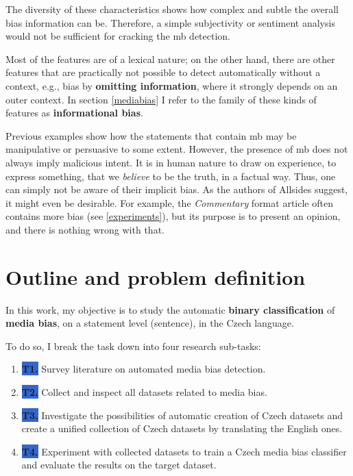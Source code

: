 The diversity of these characteristics shows how complex and subtle the overall bias information can be. Therefore, a simple subjectivity or sentiment analysis would not be sufficient for cracking the \gls{mb} detection. 

Most of the features are of a lexical nature; on the other hand, there are other features that are practically not possible to detect automatically without a context, e.g., bias by \textbf{omitting information}, where it strongly depends on an outer context. In section \ref{mediabias} I refer to the family of these kinds of features as \textbf{informational bias}.


Previous examples show how the statements that contain \gls{mb} may be manipulative or persuasive to some extent. However, the presence of \gls{mb} does not always imply malicious intent. It is in human nature to draw on experience, to express something, that we \textit{believe} to be the truth, in a factual way. Thus, one can simply not be aware of their implicit bias. As the authors of Allsides suggest, it might even be desirable. For example, the \textit{Commentary} format article often contains more bias (see \ref{experiments}), but its purpose is to present an opinion, and there is nothing wrong with that.



\section{Outline and problem definition}\label{problem_definition}
In this work, my objective is to study the automatic \textbf{binary classification} of \textbf{media bias}, on a statement level (sentence), in the Czech language.

 To do so, I break the task down into four research sub-tasks:
 \begin{enumerate}
     \item[] \colorbox{highlight}{\textbf{T1.}\label{T1}} Survey literature on automated media bias detection.
     \item[] \colorbox{highlight}{\textbf{T2.}\label{T2}} Collect and inspect all datasets related to media bias.
     \item[] \colorbox{highlight}{\textbf{T3.}\label{T3}} Investigate the possibilities of automatic creation of Czech datasets and create a unified collection of Czech datasets by translating the English ones.
     \item[] \colorbox{highlight}{\textbf{T4.}\label{T4}} Experiment with collected datasets to train a Czech media bias classifier and evaluate the results on the target dataset.
 \end{enumerate}
 
